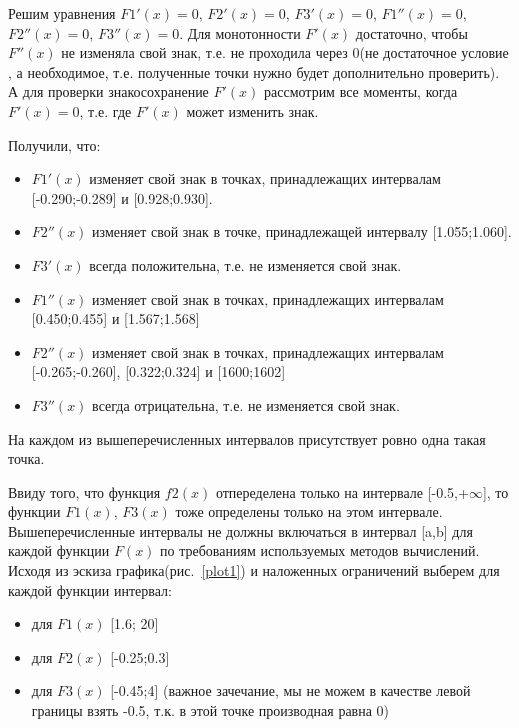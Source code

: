 \documentclass[a4paper,12pt,titlepage,finall]{article}
\begin{document}
Решим уравнения $F1'(x)=0$, $F2'(x)=0$, $F3'(x)=0$, $F1''(x)=0$, $F2''(x)=0$, $F3''(x)=0$. Для монотонности $F'(x)$ достаточно, чтобы $F''(x)$ не изменяла свой знак, т.е. не проходила через 0(не достаточное условие , а необходимое, т.е. полученные точки нужно будет дополнительно проверить). А для проверки знакосохранение $F'(x)$ рассмотрим все моменты, когда $F'(x)=0$, т.е. где $F'(x)$ может изменить знак.

Получили, что:
\begin{itemize} 

\item $F1'(x)$  изменяет свой знак в точках, принадлежащих интервалам [-0.290;-0.289] и [0.928;0.930].
\item $F2''(x)$  изменяет свой знак в точке, принадлежащей интервалу [1.055;1.060].
\item $F3'(x)$  всегда положительна, т.е. не изменяется свой знак.

\item $F1''(x)$  изменяет свой знак в точках, принадлежащих интервалам [0.450;0.455] и [1.567;1.568]
\item $F2''(x)$  изменяет свой знак в точках, принадлежащих интервалам [-0.265;-0.260], [0.322;0.324] и [1600;1602]
\item $F3''(x)$  всегда отрицательна, т.е. не изменяется свой знак.

\end{itemize}

На каждом из вышеперечисленных интервалов присутствует ровно одна такая точка.

Ввиду того, что функция $f2(x)$ отпеределена только на интервале [-0.5,+$\infty$], то функции $F1(x)$, $F3(x)$ тоже определены только на этом интервале.
Вышеперечисленные интервалы не должны включаться в интервал [a,b] для каждой функции $F(x)$ по требованиям используемых методов вычислений.
Исходя из эскиза графика(рис.~\ref{plot1}) и наложенных ограничений выберем для каждой функции интервал:

\begin{itemize} 

\item для $F1(x)$ [1.6; 20]
\item для $F2(x)$ [-0.25;0.3]
\item для $F3(x)$ [-0.45;4] (важное зачечание, мы не можем в качестве левой границы взять -0.5, т.к. в этой точке производная равна 0)

\end{itemize}
\end{document}
